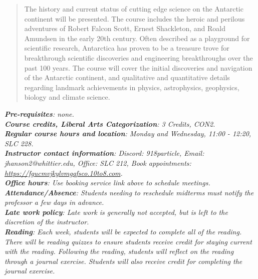 \documentclass[10pt]{article}
\begin{document}
\maketitle

\begin{abstract}
The history and current status of cutting edge science on the Antarctic continent will be presented. The course includes the heroic and perilous adventures of Robert Falcon Scott, Ernest Shackleton, and Roald Amundsen in the early 20th century. Often described as a playground for scientific research, Antarctica has proven to be a treasure trove for breakthrough scientific discoveries and engineering breakthroughs over the past 100 years. The course will cover the initial discoveries and navigation of the Antarctic continent, and qualitative and quantitative details regarding landmark achievements in physics, astrophysics, geophysics, biology and climate science.
\end{abstract}
\noindent
\textit{\textbf{Pre-requisites}: none.} \\
\textit{\textbf{Course credits, Liberal Arts Categorization}: 3 Credits, CON2.} \\
\textit{\textbf{Regular course hours and location}: Monday and Wednesday, 11:00 - 12:20, SLC 228.} \\
\textit{\textbf{Instructor contact information}: Discord: 918particle, Email: jhanson2@whittier.edu, Office: SLC 212, Book appointments: \url{https://fgucmvjkylvmgqfsco.10to8.com}.} \\
\textit{\textbf{Office hours}: Use booking service link above to schedule meetings.} \\
\textit{\textbf{Attendance/Absence}: Students needing to reschedule midterms must notify the professor a few days in advance.} \\ 
\textit{\textbf{Late work policy}: Late work is generally not accepted, but is left to the discretion of the instructor.} \\
\textit{\textbf{Reading}: Each week, students will be expected to complete all of the reading.  There will be reading quizzes to ensure students receive credit for staying current with the reading.  Following the reading, students will reflect on the reading through a journal exercise.  Students will also receive credit for completing the journal exercise.}
\end{document}
